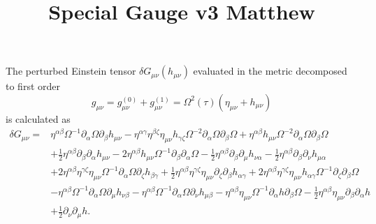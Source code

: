 \documentclass[10pt,letterpaper]{article}
\title{Special Gauge v3 Matthew}
\date{}
\begin{document}
\maketitle
\noindent
The perturbed Einstein tensor $\delta  G_{\mu\nu}( h_{\mu\nu})$ evaluated in the metric decomposed to first order 
\begin{equation}
g_{\mu\nu} = g^{(0)}_{\mu\nu} + g^{(1)}_{\mu\nu} = \Omega^2(\tau)(\eta_{\mu\nu}+h_{\mu\nu})
\end{equation}
is calculated as 
\begin{align}
\delta G_{\mu\nu}={}&\eta^{\alpha \beta} \Omega^{-1} \partial_{\alpha}\Omega \partial_{\beta}h_{\mu \nu}
 -  \eta^{\alpha \gamma} \eta^{\beta \zeta} \eta_{\mu \nu} h_{\gamma \zeta} \Omega^{-2} \partial_{\alpha}\Omega \partial_{\beta}\Omega
 + \eta^{\alpha \beta} h_{\mu \nu} \Omega^{-2} \partial_{\alpha}\Omega \partial_{\beta}\Omega\nonumber\\
& + \tfrac{1}{2} \eta^{\alpha \beta} \partial_{\beta}\partial_{\alpha}h_{\mu \nu}
 - 2 \eta^{\alpha \beta} h_{\mu \nu} \Omega^{-1} \partial_{\beta}\partial_{\alpha}\Omega
 -  \tfrac{1}{2} \eta^{\alpha \beta} \partial_{\beta}\partial_{\mu}h_{\nu \alpha}
 -  \tfrac{1}{2} \eta^{\alpha \beta} \partial_{\beta}\partial_{\nu}h_{\mu \alpha}\nonumber\\
& + 2 \eta^{\alpha \beta} \eta^{\gamma \zeta} \eta_{\mu \nu} \Omega^{-1} \partial_{\alpha}\Omega \partial_{\zeta}h_{\beta \gamma}
 + \tfrac{1}{2} \eta^{\alpha \beta} \eta^{\gamma \zeta} \eta_{\mu \nu} \partial_{\zeta}\partial_{\beta}h_{\alpha \gamma}
 + 2 \eta^{\alpha \beta} \eta^{\gamma \zeta} \eta_{\mu \nu} h_{\alpha \gamma} \Omega^{-1} \partial_{\zeta}\partial_{\beta}\Omega\nonumber\\
& -  \eta^{\alpha \beta} \Omega^{-1} \partial_{\alpha}\Omega \partial_{\mu}h_{\nu \beta}
 -  \eta^{\alpha \beta} \Omega^{-1} \partial_{\alpha}\Omega \partial_{\nu}h_{\mu \beta}- \eta^{\alpha \beta} \eta_{\mu \nu} \Omega^{-1} \partial_{\alpha}h \partial_{\beta}\Omega -  \tfrac{1}{2} \eta^{\alpha \beta} \eta_{\mu \nu} \partial_{\beta}\partial_{\alpha}h\nonumber \\
& + \tfrac{1}{2} \partial_{\nu}\partial_{\mu}h.
\end{align}
\end{document}
